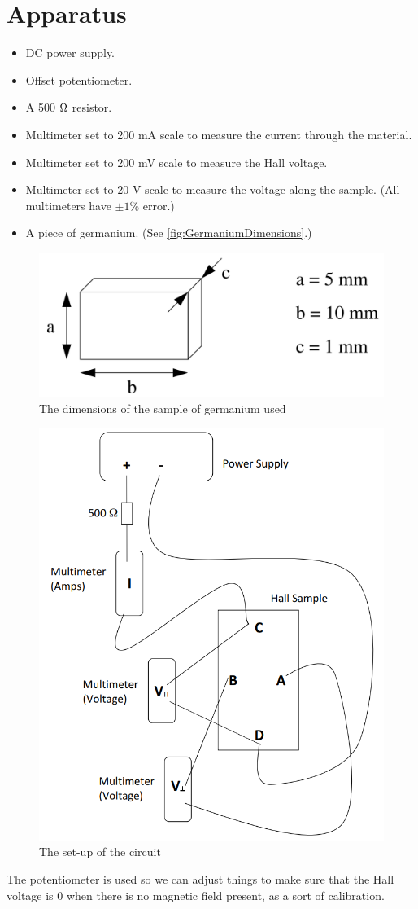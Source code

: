 \documentclass[12pt]{article}
\numberwithin{equation}{section}
\numberwithin{figure}{section}
\numberwithin{table}{section}
\begin{document}
    \section{Apparatus}\label{sec:Apparatus}
    \begin{itemize}
        \item DC power supply.
        \item Offset potentiometer.
        \item A 500 $\si[]{\ohm}$ resistor. 
        \item Multimeter set to 200 mA scale to measure the current through the material.
        \item Multimeter set to 200 mV scale to measure the Hall voltage. 
        \item Multimeter set to 20 V scale to measure the voltage along the sample. 
        (All multimeters have $\pm 1\%$ error.)
        \item A piece of germanium. (See \autoref{fig:GermaniumDimensions}.)
    \end{itemize}
    \begin{figure}[H]
        \begin{center}
            \includegraphics[width=.4\textwidth]{GermaniumDimensions.png}
            \caption{The dimensions of the sample of germanium used}
            \label{fig:GermaniumDimensions}
        \end{center}
    \end{figure}
    \begin{figure}[H]
        \begin{center}
            \includegraphics[width=.65\textwidth]{CircuitDiagram.png}
            \caption{The set-up of the circuit}
            \label{fig:CircuitDiagram}
        \end{center}
    \end{figure}
    The potentiometer is used so we can adjust things to make sure that the Hall voltage is 
    0 when there is no magnetic field present, as a sort of calibration. 
\end{document}
